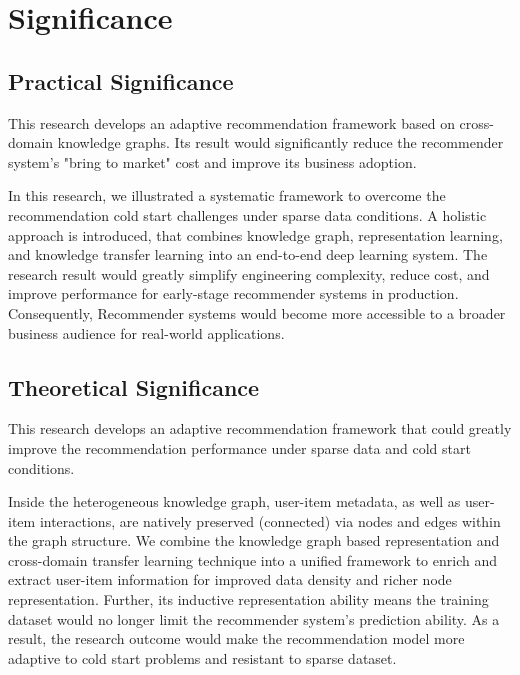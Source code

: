 \section{Significance}

\subsection{Practical Significance}
This research develops an adaptive recommendation framework based on cross-domain knowledge graphs. Its result would significantly reduce the recommender system's "bring to market" cost and improve its business adoption.

In this research, we illustrated a systematic framework to overcome the recommendation cold start challenges under sparse data conditions. 
A holistic approach is introduced, that combines knowledge graph, representation learning, and knowledge transfer learning into an end-to-end deep learning system. 
The research result would greatly simplify engineering complexity, reduce cost, and improve performance for early-stage recommender systems in production. Consequently, Recommender systems would become more accessible to a broader business audience for real-world applications.


\subsection{Theoretical Significance}
This research develops an adaptive recommendation framework that could greatly improve the recommendation performance under sparse data and cold start conditions.

Inside the heterogeneous knowledge graph, user-item metadata, as well as user-item interactions, are natively preserved (connected) via nodes and edges within the graph structure.  We combine the knowledge graph based representation and cross-domain transfer learning technique into a unified framework to enrich and extract user-item information for improved data density and richer node representation. Further, its inductive representation ability means the training dataset would no longer limit the recommender system's prediction ability. 
As a result, the research outcome would make the recommendation model more adaptive to cold start problems and resistant to sparse dataset.
